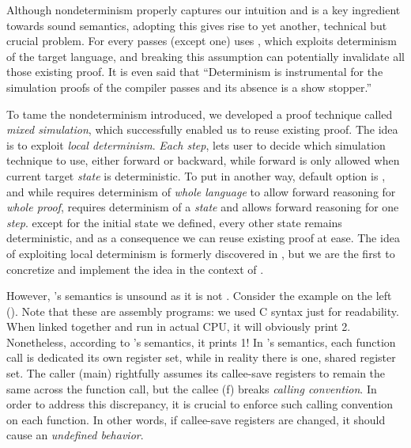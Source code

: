 {


Although nondeterminism properly captures our intuition and is a key ingredient towards sound semantics, adopting this gives rise to yet another, technical but crucial problem.
For every passes (except one) \cc{} uses \fsim{}, which exploits determinism of the target language, and breaking this assumption can potentially invalidate all those existing proof.
It is even said that ``Determinism is instrumental for the simulation proofs of the compiler passes and its absence is a show stopper.'' \cite{besson:intptr}


To tame the nondeterminism introduced, we developed a proof technique called \textit{mixed simulation}, which successfully enabled us to reuse existing proof.
The idea is to exploit \textit{local determinism}.
\textit{Each step}, \xsim{} lets user to decide which simulation technique to use, either forward or backward, while forward is only allowed when current target \textit{state} is deterministic.
To put in another way, default option is \bsim{}, and while \fsim{} requires determinism of \textit{whole language} to allow forward reasoning for \textit{whole proof}, \xsim{} requires determinism of a \textit{state} and allows forward reasoning for one \textit{step}.
\nb{} except for the initial state we defined, every other state remains deterministic, and as a consequence we can reuse existing proof at ease.
The idea of exploiting local determinism is formerly discovered in \cite{neis:pilsner}, but we are the first to concretize and implement the idea in the context of \cc{}. 





\todo{}



However, \ccc{}'s semantics is unsound as it is not \lbound{}.
Consider the example on the left ().
Note that these are assembly programs: we used C syntax just for readability.
When linked together and run in actual CPU, it will obviously print 2.
Nonetheless, according to \ccc{}'s semantics, it prints 1!
In \ccc{}'s semantics, each function call is dedicated its own register set, while in reality there is one, shared register set.
The caller (main) rightfully assumes its callee-save registers to remain the same across the function call, but the callee (f) breaks \textit{calling convention}.
In order to address this discrepancy, it is crucial to enforce such calling convention on each function.
In other words, if callee-save registers are changed, it should cause an \textit{undefined behavior}.






}
